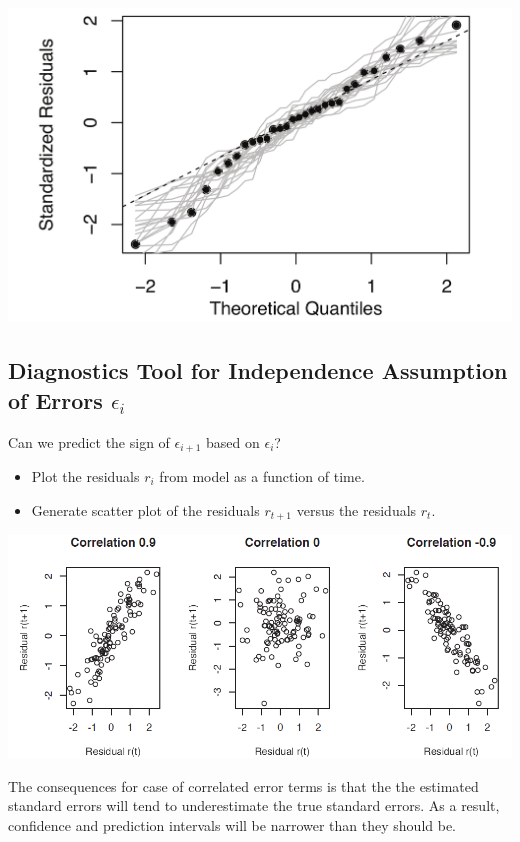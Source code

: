 \documentclass[11pt]{article}
\begin{document}
\begin{center}
	\includegraphics[width=0.4\linewidth]{img/QQ_plot}
\end{center}


\subsection{Diagnostics Tool for Independence Assumption of Errors \texorpdfstring{$\epsilon_i$}\ }
Can we predict the sign of $\epsilon_{i+1}$ based on $\epsilon_i$?

\begin{itemize}[noitemsep]
	\item Plot the residuals $r_i$ from model as a function of time.
	\item Generate scatter plot of the residuals $r_{t+1}$ versus the residuals $r_t$.
\end{itemize}

\begin{center}
	\includegraphics[width=0.5\linewidth]{img/residual_independence}
\end{center}
\begin{theorem}
	The consequences for case of correlated error terms is that the  the estimated standard errors will tend to underestimate the true standard errors. As a result, confidence and prediction intervals will be narrower than they should be.
\end{theorem}
\end{document}
